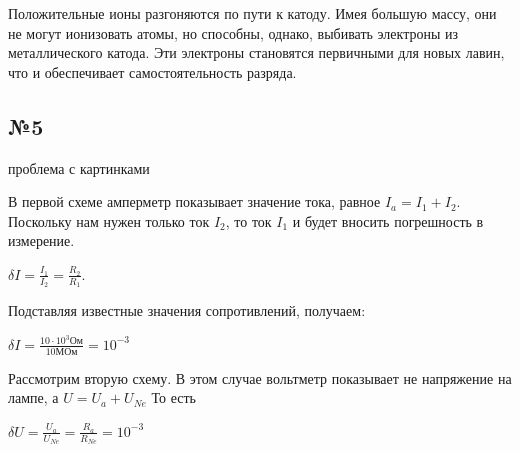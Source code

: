 Положительные ионы разгоняются по пути к катоду. Имея большую массу, они не могут ионизовать атомы, но способны, однако, выбивать электроны из металлического катода. Эти электроны становятся первичными для новых лавин, что и обеспечивает самостоятельность разряда.
\subsection{№5}
\begin{center}
 проблема с картинками
\end{center}

В первой схеме амперметр показывает значение тока, равное $I_a=I_1+I_2$. Поскольку нам нужен только ток $I_2$, то ток $I_1$ и будет вносить погрешность в измерение. 
\begin{center}
$\delta I= \frac{I_1}{I_2}=\frac{R_2}{R_1}$. 
\end{center}
Подставляя известные значения сопротивлений, получаем:
\begin{center}
$\delta I=\frac{10\cdot10^3\text{Ом}}{10\text{МОм}}=10^{-3}$
\end{center}
Рассмотрим вторую схему. В этом случае вольтметр  показывает не напряжение на лампе, а $U=U_a+U_{Ne}$
То есть 

\begin{center}
$ \delta U =\frac{U_a}{U_{Ne}}=\frac{R_a}{R_{Ne}} = 10^{-3} $
\end{center}



